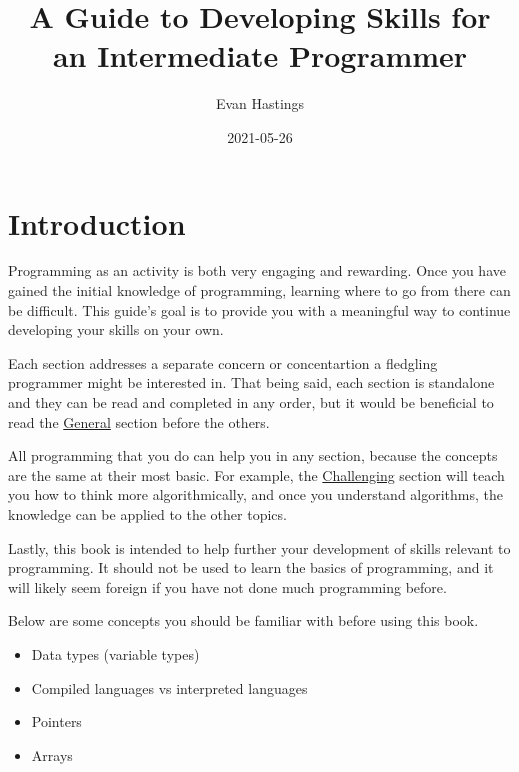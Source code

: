 \documentclass[12pt, oneside, a4paper]{book}
\title{A Guide to Developing Skills for an Intermediate Programmer}
\date{2021-05-26}
\author{Evan Hastings}
\begin{document}
   \maketitle
   \newpage
   \tableofcontents
   \newpage
   \chapter{Introduction}
      Programming as an activity is both very engaging and rewarding.
      Once you have gained the initial knowledge of programming, learning where to go from there can be difficult.
      This guide's goal is to provide you with a meaningful way to continue developing your skills on your own.

      Each section addresses a separate concern or concentartion a fledgling programmer might be interested in.
      That being said, each section is standalone and they can be read and completed in any order, but it would be beneficial to read the \hyperref[chap:general]{General} section before the others.

      All programming that you do can help you in any section, because the concepts are the same at their most basic.
      For example, the \hyperref[chap:challenge]{Challenging} section will teach you how to think more algorithmically, and once you understand algorithms, the knowledge can be applied to the other topics.

      Lastly, this book is intended to help further your development of skills relevant to programming.
      It should not be used to learn the basics of programming, and it will likely seem foreign if you have not done much programming before.

      Below are some concepts you should be familiar with before using this book\footnotemark.

      \begin{itemize}
         \item Data types (variable types)
         \item Compiled languages vs interpreted languages
         \item Pointers
         \item Arrays
      \end{itemize}
\end{document}
